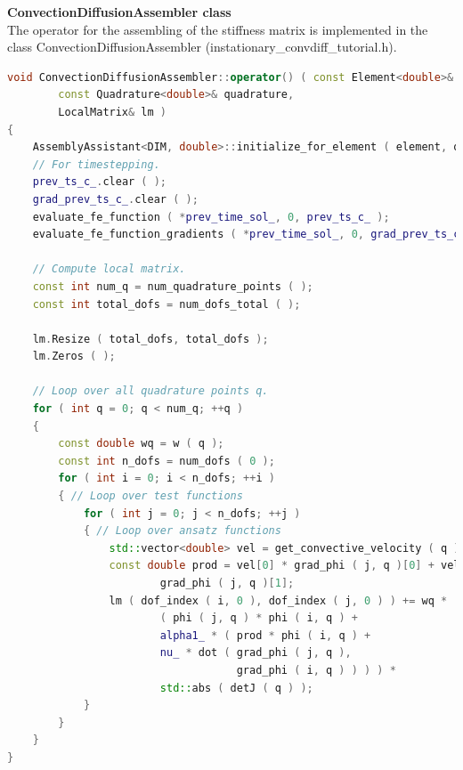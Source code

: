 \documentclass[a4paper, 11pt, twoside]{article}
\begin{document}
\textbf{ConvectionDiffusionAssembler class}\\
The operator for the assembling of the stiffness matrix is implemented in the class ConvectionDiffusionAssembler (instationary\_convdiff\_tutorial.h).
\begin{lstlisting}[language=C++, basicstyle={\footnotesize, \ttfamily}, keywordstyle=\color{blue}, numbers=none, tabsize=4]
void ConvectionDiffusionAssembler::operator() ( const Element<double>& element,
        const Quadrature<double>& quadrature,
        LocalMatrix& lm )
{
    AssemblyAssistant<DIM, double>::initialize_for_element ( element, quadrature );
    // For timestepping.
    prev_ts_c_.clear ( );
    grad_prev_ts_c_.clear ( );
    evaluate_fe_function ( *prev_time_sol_, 0, prev_ts_c_ );
    evaluate_fe_function_gradients ( *prev_time_sol_, 0, grad_prev_ts_c_ );

    // Compute local matrix.
    const int num_q = num_quadrature_points ( );
    const int total_dofs = num_dofs_total ( );

    lm.Resize ( total_dofs, total_dofs );
    lm.Zeros ( );

    // Loop over all quadrature points q.
    for ( int q = 0; q < num_q; ++q )
    {
        const double wq = w ( q );
        const int n_dofs = num_dofs ( 0 );
        for ( int i = 0; i < n_dofs; ++i )
        { // Loop over test functions
            for ( int j = 0; j < n_dofs; ++j )
            { // Loop over ansatz functions
                std::vector<double> vel = get_convective_velocity ( q );
                const double prod = vel[0] * grad_phi ( j, q )[0] + vel[1] *
                        grad_phi ( j, q )[1];
                lm ( dof_index ( i, 0 ), dof_index ( j, 0 ) ) += wq * 
                        ( phi ( j, q ) * phi ( i, q ) +
                        alpha1_ * ( prod * phi ( i, q ) +
                        nu_ * dot ( grad_phi ( j, q ),
                                    grad_phi ( i, q ) ) ) ) *
                        std::abs ( detJ ( q ) );
            }
        }
    }
}
\end{lstlisting}
\end{document}
